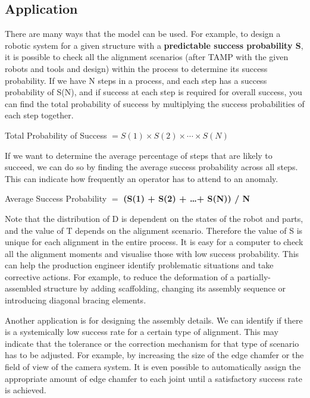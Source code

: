 
\vspace{1\baselineskip}
\subsection{Application}

There are many ways that the model can be used. For example, to design a robotic system for a given structure with a \textbf{predictable success probability S}, it is possible to check all the alignment scenarios (after TAMP with the given robots and tools and design) within the process to determine its success probability. If we have N steps in a process, and each step has a success probability of S(N), and if success at each step is required for overall success, you can find the total probability of success by multiplying the success probabilities of each step together.

Total Probability of Success $= S(1) \times S(2) \times \cdots \times S(N)$

If we want to determine the average percentage of steps that are likely to succeed, we can do so by finding the average success probability across all steps. This can indicate how frequently an operator has to attend to an anomaly.

Average Success Probability $=$\textbf{ (S(1) + S(2) + \ldots + S(N)) / N }

Note that the distribution of D is dependent on the states of the robot and parts, and the value of T depends on the alignment scenario. Therefore the value of S is unique for each alignment in the entire process. It is easy for a computer to check all the alignment moments and visualise those with low success probability. This can help the production engineer identify problematic situations and take corrective actions. For example, to reduce the deformation of a partially-assembled structure by adding scaffolding, changing its assembly sequence or introducing diagonal bracing elements.

Another application is for designing the assembly details. We can identify if there is a systemically low success rate for a certain type of alignment. This may indicate that the tolerance or the correction mechanism for that type of scenario has to be adjusted. For example, by increasing the size of the edge chamfer or the field of view of the camera system. It is even possible to automatically assign the appropriate amount of edge chamfer to each joint until a satisfactory success rate is achieved.

